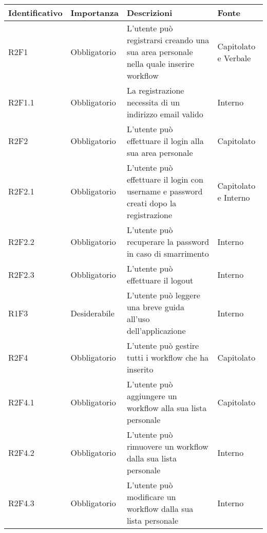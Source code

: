 \begin{center}
	\renewcommand{\arraystretch}{1.5}
	\begin{longtable}{  >{\RaggedRight}p{2.5cm}  
						>{\RaggedRight}p{2.1cm} 
						>{\RaggedRight}p{7cm}  
						>{\RaggedRight}p{1.7cm} 
						}
		\rowcolor{tableHeadYellow}
		\textbf{Identificativo}   & \textbf{Importanza} & \textbf{Descrizioni} & \textbf{Fonte} \\ 
		\endhead
		R2F1   & Obbligatorio & L'utente può registrarsi creando una sua area personale nella quale inserire workflow                & Capitolato e Verbale \\  
		R2F1.1 & Obbligatorio & La registrazione necessita di un indirizzo email valido                               & Interno              \\  
		R2F2   & Obbligatorio & L'utente può effettuare il login alla sua area personale                                              & Capitolato           \\  
		R2F2.1   & Obbligatorio & L'utente può effettuare il login con username e password creati dopo la registrazione               & Capitolato e Interno      \\  
		R2F2.2 & Obbligatorio & L'utente può recuperare la password in caso di smarrimento                                            & Interno              \\  
		R2F2.3 & Obbligatorio & L'utente può effettuare il logout                                                                    & Interno              \\  
		R1F3   & Desiderabile & L'utente può leggere una breve guida all'uso dell'applicazione                                        & Interno              \\  
		R2F4   & Obbligatorio & L'utente può gestire tutti i workflow che ha inserito                                                 & Capitolato           \\  
		R2F4.1 & Obbligatorio & L'utente può aggiungere un workflow alla sua lista personale                                          & Capitolato           \\  
		R2F4.2 & Obbligatorio & L'utente può rimuovere un workflow dalla sua lista personale                                          & Interno              \\  
		R2F4.3 & Obbligatorio & L'utente può modificare un workflow dalla sua lista personale                                         & Interno              \\  

\end{longtable}
\end{center}
